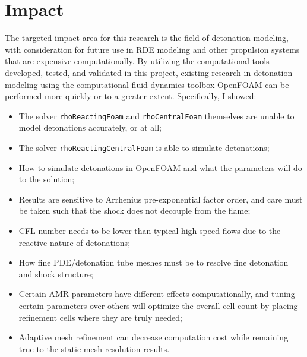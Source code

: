 \section{Impact}
The targeted impact area for this research is the field of detonation modeling, with consideration for future use in RDE modeling and other propulsion systems that are expensive computationally. By utilizing the computational tools developed, tested, and validated in this project, existing research in detonation modeling using the computational fluid dynamics toolbox OpenFOAM can be performed more quickly or to a greater extent. Specifically, I showed:
\begin{itemize}
\item The solver \verb|rhoReactingFoam| and \verb|rhoCentralFoam| themselves are unable to model detonations accurately, or at all;
\item The solver \verb|rhoReactingCentralFoam| is able to simulate detonations;
\item How to simulate detonations in OpenFOAM and what the parameters will do to the solution;
\item Results are sensitive to Arrhenius pre-exponential factor order, and care must be taken such that the shock does not decouple from the flame;
\item CFL number needs to be lower than typical high-speed flows due to the reactive nature of detonations;
\item How fine PDE/detonation tube meshes must be to resolve fine detonation and shock structure;
\item Certain AMR parameters have different effects computationally, and tuning certain parameters over others will optimize the overall cell count by placing refinement cells where they are truly needed;
\item Adaptive mesh refinement can decrease computation cost while remaining true to the static mesh resolution results. 
\end{itemize}

